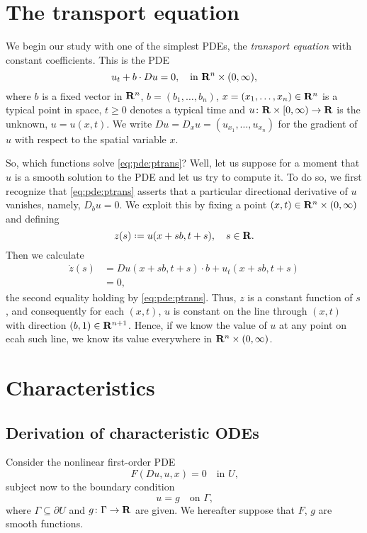 \section{The transport equation}
We begin our study with one of the simplest PDEs, the \emph{transport
  equation} with constant coefficients. This is the PDE
\begin{equation}
  \label{eq:pde:ptrans}
  u_t+b\cdot Du=0,\quad \text{in \(\mathbf{R}^n\times(0,\infty)\),}
\end{equation}
where \(b\) is a fixed vector in \(\mathbf{R}^n\), \(b=(b_1,\dotsc,b_n)\),
\(x=(x_1,\dotsc,x_n)\in\mathbf{R}^n\) is a typical point in space, \(t\geq 0\)
denotes a typical time and \(u\colon\mathbf{R}\times[0,\infty)\to\mathbf{R}\) is the
unknown, \(u=u(x,t)\). We write \(Du=D_xu=(u_{x_1},\dotsc,u_{x_n})\) for
the gradient of \(u\) with respect to the spatial variable \(x\).

So, which functions solve \eqref{eq:pde:ptrans}? Well, let us suppose for a
moment that \(u\) is a smooth solution to the PDE and let us try to compute
it. To do so, we first recognize that \eqref{eq:pde:ptrans} asserts that a
particular directional derivative of \(u\) vanishes, namely, \(D_bu=0\). We
exploit this by fixing a point \((x,t)\in\mathbf{R}^n\times(0,\infty)\) and
defining
\[
  z(s)\defeq u(x+sb,t+s),\quad s\in\bfR.
\]
Then we calculate
\begin{align*}
  \dot z(s)&=Du(x+sb,t+s)\cdot b+u_t(x+sb,t+s)\\
           &=0,
\end{align*}
the second equality holding by \eqref{eq:pde:ptrans}. Thus, \(z\) is a
constant function of \(s\), and consequently for each \((x,t)\), \(u\) is
constant on the line through \((x,t)\) with direction
\((b,1)\in\mathbf{R}^{n+1}\). Hence, if we know the value of \(u\) at any point
on ecah such line, we know its value everywhere in
\(\mathbf{R}^n\times(0,\infty)\).

\section{Characteristics}
\subsection{Derivation of characteristic ODEs}
Consider the nonlinear first-order PDE
\begin{equation}
  \label{eq:pde:pde-1}
  F(Du,u,x)=0\quad\text{in \(U\),}
\end{equation}
subject now to the boundary condition
\begin{equation}
  \label{eq:pde:initial-cond-1}
  u=g\quad\text{on \(\Gamma\),}
\end{equation}
where \(\Gamma\subseteq\partial U\) and \(g\colon\Gamma\to\mathbf{R}\) are
given. We hereafter suppose that \(F\), \(g\) are smooth functions.

